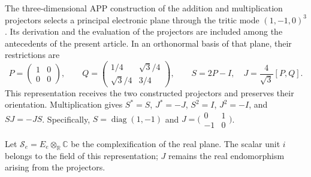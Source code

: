The three-dimensional APP construction of the addition and
multiplication projectors selects a principal electronic plane through the
tritic mode $(1,-1,0)^3$. Its derivation and the evaluation of the
projectors are included among the antecedents of the present
article. In an orthonormal basis of that plane, their restrictions
are
\begin{equation}
 P=\begin{pmatrix}1&0\\0&0\end{pmatrix},\qquad
 Q=\begin{pmatrix}1/4&\sqrt3/4\\\sqrt3/4&3/4\end{pmatrix},
 \qquad S=2P-I,\quad J=\frac4{\sqrt3}[P,Q].
 \label{vi:vi:eq:bloque-electronico}
\end{equation}
This representation receives the two constructed projectors and
preserves their orientation. Multiplication gives
$S^*=S$, $J^*=-J$, $S^2=I$, $J^2=-I$, and $SJ=-JS$.
Specifically, $S=\operatorname{diag}(1,-1)$ and
$J=\bigl(\begin{smallmatrix}0&1\\-1&0\end{smallmatrix}\bigr)$.

Let $\mathscr S_e=E_e\otimes_{\mathbb R}\mathbb C$ be the
complexification of the real plane. The scalar unit $i$ belongs
to the field of this representation; $J$ remains the real
endomorphism arising from the projectors.

